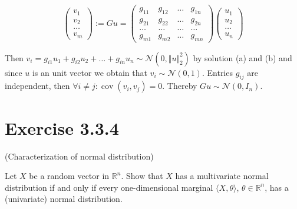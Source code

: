 \documentclass{article}
\DeclareMathOperator{\cov}{cov}
\begin{document}
$$
\begin{pmatrix}
    v_1 \\
    v_2 \\
    \dots \\
    v_m
\end{pmatrix} :=
Gu = 
\begin{pmatrix}
    g_{11} & g_{12} & \dots & g_{1n} \\
    g_{21} & g_{22} & \dots & g_{2n} \\
    \dots & \dots & \dots & \dots \\
    g_{m1} & g_{m2} & \dots & g_{mn}
\end{pmatrix}
\begin{pmatrix}
    u_1 \\
    u_2 \\
    \dots \\
    u_n
\end{pmatrix}
$$

Then $v_i = g_{i1}u_1 + g_{i2}u_2 + \dots + g_{in}u_n \sim \mathcal N (0, \Vert u \Vert^2_2)$ by solution (a) and (b) and since $u$ is an unit vector we obtain that $v_i \sim \mathcal N (0, 1)$. Entries $g_{ij}$ are independent, then $\forall i \neq j: \cov(v_i, v_j) = 0$. Thereby $Gu \sim \mathcal N (0, I_n)$.

\section{Exercise 3.3.4}

(Characterization of normal distribution)

Let $X$ be a random vector in $\mathbb R^n$. Show that $X$ has a multivariate normal distribution if and only if every one-dimensional marginal $\langle X, \theta \rangle$, $\theta \in \mathbb R^n$, has a (univariate) normal distribution.
\end{document}
